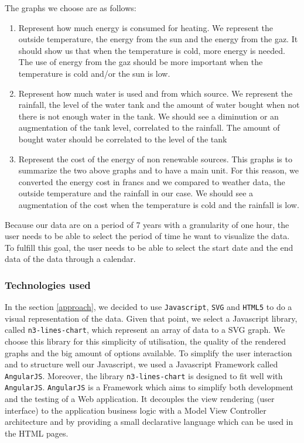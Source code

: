 \documentclass{acm_proc_article-sp}
\begin{document}
The graphs we choose are as follows:
\begin{enumerate}
\item Represent how much energy is consumed for heating. We represent the outside temperature, the energy from the sun and the energy from the gaz. It should show us that when the temperature is cold, more energy is needed. The use of energy from the gaz should be more important when the temperature is cold and/or the sun is low.
\item Represent how much water is used and from which source. We represent the rainfall, the level of the water tank and the amount of water bought when not there is not enough water in the tank. We should see a diminution or an augmentation of the tank level, correlated to the rainfall. The amount of bought water should be correlated to the level of the tank 
\item Represent the cost of the energy of non renewable sources. This graphs is to summarize the two above graphs and to have a main unit. For this reason, we converted the energy cost in francs and we compared to weather data, the outside temperature and the rainfall in our case. We should see a augmentation of the cost when the temperature is cold and the rainfall is low.
\end{enumerate}

Because our data are on a period of 7 years with a granularity of one hour, the user needs to be able to select the period of time he want to visualize the data. To fulfill this goal, the user needs to be able to select the start date and the end data of the data through a calendar.

\subsubsection{Technologies used}
In the section \ref{approach}, we decided to use \texttt{Javascript}, \texttt{SVG} and \texttt{HTML5} to do a visual representation of the data. Given that point, we select a Javascript library, called \texttt{n3-lines-chart}\cite{n3}, which represent an array of data to a SVG graph. We choose this library for this simplicity of utilisation, the quality of the rendered graphs and the big amount of options available. To simplify the user interaction and to structure well our Javascript, we used a Javascript Framework called \texttt{AngularJS}\cite{angular}. Moreover, the library \texttt{n3-lines-chart} is designed to fit well with \texttt{AngularJS}. \texttt{AngularJS} is a Framework which aims to simplify both development and the testing of a Web application. It decouples the view rendering (user interface) to the application business logic with a Model View Controller architecture and by providing a small declarative language which can be used in the HTML pages.
\end{document}

